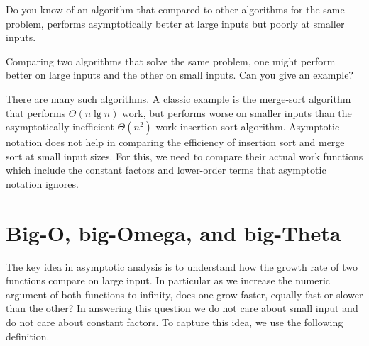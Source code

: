 \begin{cluster}
\label{grp:tch:analysis::asymptotics::know}

\begin{teachask}
\label{tch:analysis::asymptotics::know}
Do you know of an algorithm that compared to other algorithms for the
same problem, performs asymptotically better at large inputs but poorly
at smaller inputs.

\end{teachask}
\end{cluster}

\begin{flex}
\label{grp:xrcs:analysis::asymptotics::comparing}

\begin{exercise}
\label{xrcs:analysis::asymptotics::comparing}
    Comparing two algorithms that solve the same problem, one might
    perform better on large inputs and the other on small inputs.  
    Can you give an example? 
  

\end{exercise}

\begin{solution}
\label{sol:analysis::asymptotics::classic}
    There are many such algorithms.  
        A classic example is the merge-sort algorithm that performs
    $\Theta(n\lg{n})$ work, but performs worse on smaller inputs than the
    asymptotically inefficient $\Theta(n^2)$-work insertion-sort
    algorithm.
        Asymptotic notation does not help in comparing the efficiency of
    insertion sort and merge sort at small input sizes.
        For this, we need to compare their actual work functions which include
    the constant factors and lower-order terms that asymptotic notation
    ignores.
  

\end{solution}
\end{flex}


\section{Big-O, big-Omega, and big-Theta}
\label{sec:analysis::asymptotics::big-o-big-omega-and-big-theta}

\begin{cluster}
\label{grp:grm:analysis::asymptotics::idea}

\begin{gram}
\label{grm:analysis::asymptotics::idea}
  The key idea in asymptotic analysis is to understand how the growth
  rate of two functions compare on large input.  In 
  particular as we increase the numeric argument of both functions to
  infinity, does one grow faster, equally fast or slower than the
  other?   In
  answering this question we do not care about small input and 
  do not care about constant factors.  To capture this idea, we use the following
  definition.

\end{gram}
\end{cluster}


